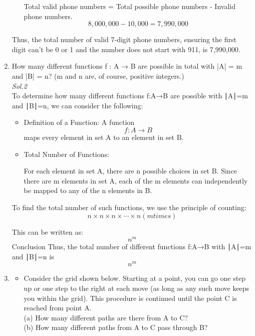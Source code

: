 \documentclass{book}
\begin{document}
\begin{enumerate}
\begin{itemize}
		            Total valid phone numbers = Total possible phone numbers - Invalid phone numbers.\\
		            \[
			            8,000,000−10,000=7,990,000
		            \]
	      \end{itemize}
	      Thus, the total number of valid 7-digit phone numbers, ensuring the first digit can't be 0 or 1 and the number does not start with 911, is 7,990,000.
	\item How many different functions f : A → B are possible in total
	      with |A| = m and |B| = n? (m and n are, of course, positive
	      integers.)\\
	      \textit{ Sol.2}\\

	      To determine how many different functions
	      f:A→B are possible with
	      ∣A∣=m and ∣B∣=n, we can consider the following:
	      \begin{itemize}
		      \item
		            Definition of a Function: A function
		            \[
			            f:A\rightarrow B
		            \] maps every element in set
		            A to an element in set
		            B.
		      \item
		            Total Number of Functions:

		            For each element in set
		            A, there are
		            n possible choices in set
		            B.
		            Since there are
		            m elements in set
		            A, each of the
		            m elements can independently be mapped to any of the
		            n elements in
		            B.

	      \end{itemize}

	      To find the total number of such functions, we use the principle of counting:
	      \[
		      n×n×n×⋯×n(m times)
	      \]

	      This can be written as:
	      \[
		      n^m
	      \]
	      Conclusion
	      Thus, the total number of different functions
	      f:A→B with
	      ∣A∣=m and
	      ∣B∣=n is
	      \[
		      n^m
	      \]
	\item
	      \begin{itemize}
		      \item  Consider the grid shown below. Starting at a point, you can
		            go one step up or one step to the right at each move (as long
		            as any such move keeps you within the grid). This procedure
		            is continued until the point C is reached from point A.\\
		            (a) How many different paths are there from A to C?\\
		            (b) How many different paths from A to C pass through B?\\
\end{itemize}
\end{enumerate}
\end{document}
